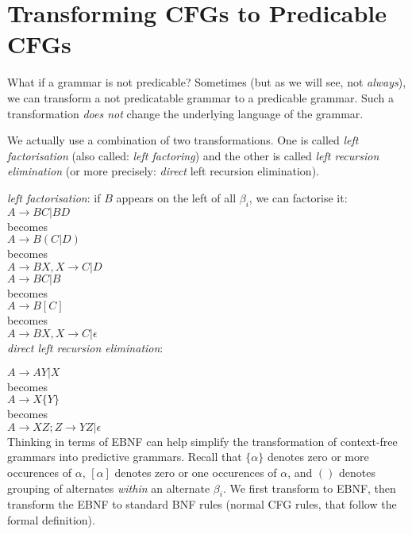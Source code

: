 \section{Transforming CFGs to Predicable CFGs}


What if a grammar is not predicable?
Sometimes (but as we will see, not \textit{always}), 
we can transform a not predicatable grammar to a predicable grammar.
Such a transformation \textit{does not} change the underlying language of the grammar. 

We actually use a combination of two transformations.
One is called \textit{left factorisation} (also called: \textit{left factoring})
and the other is called \textit{left recursion elimination}  
(or more precisely: \textit{direct} left recursion elimination). 

\textit{left factorisation}:
if $B$ appears on the left of all $\beta_i$, we can factorise it: \\

$A \rightarrow B C | B D$ \\
becomes \\
$A \rightarrow B (C | D)$ \\
becomes \\
$A \rightarrow B X, X \rightarrow C | D$ \\


$A \rightarrow B C | B$ \\
becomes \\
$A \rightarrow B [C]$ \\
becomes \\
$A \rightarrow B X, X \rightarrow C | \epsilon$ \\


\textit{direct left recursion elimination}:

$A \rightarrow AY | X$\\
becomes \\
$A \rightarrow X \{Y\}$ \\
becomes \\
$A \rightarrow X Z; Z \rightarrow YZ | \epsilon $ \\



Thinking in terms of EBNF can help simplify the 
transformation of context-free grammars into predictive grammars. 
Recall that $\{\alpha\}$ denotes zero or more occurences of $\alpha$, 
$[\alpha]$ denotes zero or one occurences of $\alpha$, and 
$()$ denotes grouping of alternates \textit{within} an alternate $\beta_i$. 
We first transform to EBNF, then transform the EBNF to standard BNF rules 
(normal CFG rules, that follow the formal definition). 

